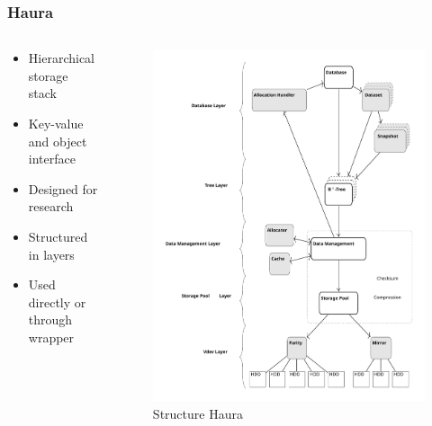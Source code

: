 \documentclass[
	aspectratio=169,
	compress,
]{beamer}
\newcommand{\navframetitle}[1]{\frametitle{#1\hfill{\footnotesize\lastsection{}}}}
\begin{document}
\begin{frame}
	\navframetitle{Haura}
	
	\begin{columns}
		\begin{column}{0.5\textwidth}
			\begin{itemize}
				\item Hierarchical storage stack
				\item Key-value and object interface
				\item Designed for research
				\item Structured in layers
				\item Used directly or through wrapper
			\end{itemize}
		\end{column}
		\begin{column}{0.5\textwidth}
			\begin{figure}[ht]
    			\centering
    			\includegraphics[scale=0.2]{overview_haura_level.pdf}
    			\caption{Structure Haura \cite{wiedemann2018modern}}
        		\label{fig:structure Haura}
			\end{figure}
		\end{column}
	\end{columns}
\end{frame}
\end{document}
